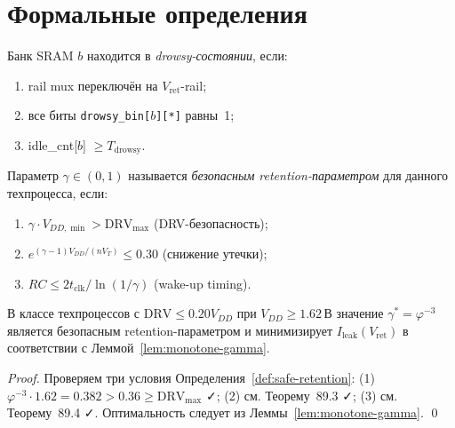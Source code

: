\section{Формальные определения}
\label{sec:glava89-definitions}

\begin{definition}
\label{def:drowsy-state}
Банк SRAM $b$ находится в \emph{drowsy-состоянии}, если:
\begin{enumerate}
  \item rail mux переключён на $V_\mathrm{ret}$-rail;
  \item все биты \texttt{drowsy\_bin[$b$][*]} равны~1;
  \item idle\_cnt[$b$] $\geq T_\mathrm{drowsy}$.
\end{enumerate}
\end{definition}

\begin{definition}
\label{def:safe-retention}
Параметр $\gamma \in (0,1)$ называется \emph{безопасным retention-параметром}
для данного техпроцесса, если:
\begin{enumerate}
  \item $\gamma \cdot V_{DD,\min} > \mathrm{DRV}_\mathrm{max}$ (DRV-безопасность);
  \item $e^{(\gamma-1) V_{DD}/(n V_T)} \leq 0.30$ (снижение утечки);
  \item $RC \leq 2 t_\mathrm{clk}/\ln(1/\gamma)$ (wake-up timing).
\end{enumerate}
\end{definition}

\begin{proposition}
\label{prop:phi3-optimal}
В классе техпроцессов с $\mathrm{DRV} \leq 0.20 V_{DD}$ при $V_{DD} \geq 1.62\,\text{В}$
значение $\gamma^* = \varphi^{-3}$ является безопасным retention-параметром
и минимизирует $I_\mathrm{leak}(V_\mathrm{ret})$ в соответствии с Леммой~\ref{lem:monotone-gamma}.
\end{proposition}
\begin{proof}
Проверяем три условия Определения~\ref{def:safe-retention}:
(1) $\varphi^{-3} \cdot 1.62 = 0.382 > 0.36 \geq \mathrm{DRV}_\mathrm{max}$ ✓;
(2) см. Теорему~89.3 ✓;
(3) см. Теорему~89.4 ✓.
Оптимальность следует из Леммы~\ref{lem:monotone-gamma}.
\qed
\end{proof}

